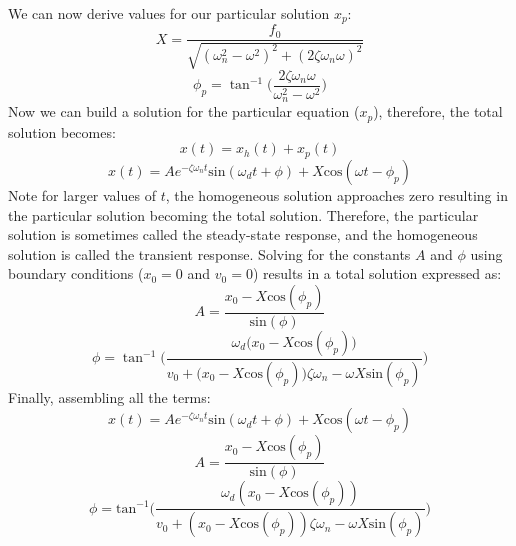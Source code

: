 \documentclass[12pt,letter]{article}
\numberwithin{ex}{section} %
\numberwithin{re}{section} %
\numberwithin{vcs}{section} %
\begin{document}
			We can now derive values for our particular solution $x_p$:
			\begin{equation}
				X = \frac{f_0}{\sqrt{(\omega_n^2 - \omega^2)^2 +  (2\zeta \omega_n \omega)^2}} 
				\label{eq:X_damped}
			\end{equation}	
			\begin{equation}
				\phi_p = \tan^{-1} \bigg(\frac{2\zeta \omega_n \omega}{\omega_n^2 - \omega^2}\bigg)
			\end{equation}				
			Now we can build a solution for the particular equation ($x_p$), therefore, the total solution becomes:
			\begin{equation}
				x(t) = x_h(t) + x_p(t)
			\end{equation}
			\begin{equation}
				x(t) = Ae^{-\zeta \omega_n t}\text{sin}(\omega_d t + \phi) +  X \text{cos}(\omega t - \phi_p)
			\end{equation}				
			Note for larger values of $t$, the homogeneous solution approaches zero resulting in the particular solution becoming the total solution. Therefore, the particular solution is sometimes called the steady-state response, and the homogeneous solution is called the transient response. Solving for the constants $A$ and $\phi$ using boundary conditions ($x_0=0$ and $v_0=0$) results in a total solution expressed as:
			\begin{equation}
				A = \frac{x_0 -X \text{cos}(\phi_p)}{\text{sin}(\phi)}
			\end{equation}			 
			\begin{equation}
				\phi =  \tan^{-1} \bigg(\frac{\omega_d \big( x_0 -X \text{cos}(\phi_p)\big)}{v_0 + \big(x_0 - X \text{cos}(\phi_p)\big) \zeta \omega_n - \omega X \text{sin}(\phi_p) }\bigg)
			\end{equation}			
			Finally, assembling all the terms:
			\begin{equation}
				x(t) = Ae^{-\zeta \omega_n t}\text{sin}(\omega_d t + \phi) +  X \text{cos}(\omega t - \phi_p)
				\label{eq:damped_forced_x}
			\end{equation}
			\begin{equation}
				A = \frac{x_0 -X \text{cos}(\phi_p)}{\text{sin}(\phi)}
			\end{equation}			 
			\begin{equation}
				\phi =  \text{tan}^{-1}\bigg(\frac{\omega_d ( x_0 -X \text{cos}(\phi_p))}{v_0 + (x_0 - X \text{cos}(\phi_p)) \zeta \omega_n - \omega X \text{sin}(\phi_p) }\bigg)
			\end{equation}	
\end{document}
